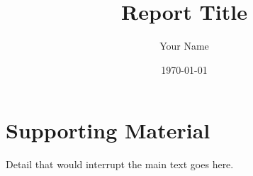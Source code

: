 \documentclass[11pt]{report}
\title{Report Title}
\author{Your Name}
\date{\today}
\begin{document}
\maketitle
\tableofcontents




\appendix
\chapter{Supporting Material}
Detail that would interrupt the main text goes here.
\end{document}
